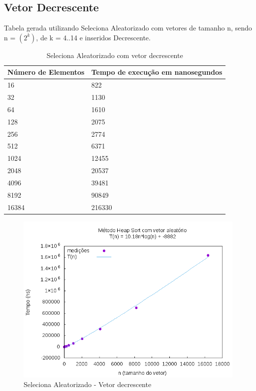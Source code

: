 \documentclass[12pt,a4paper,twoside]{report}
\begin{document}
\subsection{Vetor Decrescente}
Tabela gerada utilizando Seleciona Aleatorizado com vetores de tamanho n, sendo n = $(2^k)$, de k = 4..14 e inseridos Decrescente.
\begin{table}[H]
\centering
\caption{Seleciona Aleatorizado com vetor decrescente}
\label{my-label}
\begin{tabular}{|l|l|}
\hline
\multicolumn{1}{|c|}{\textbf{Número de Elementos}} & \multicolumn{1}{c|}{\textbf{Tempo de execução em nanosegundos}} \\ \hline
16 & 822 \\ \hline
32 & 1130 \\ \hline
64 & 1610 \\ \hline
128 & 2075 \\ \hline
256 & 2774 \\ \hline
512 & 6371 \\ \hline
1024 & 12455 \\ \hline
2048 & 20537 \\ \hline
4096 & 39481 \\ \hline
8192 & 90849 \\ \hline
16384 & 216330 \\ \hline

\end{tabular}
\end{table}

\begin{figure}[H]
    \centering
    \includegraphics[width=0.7\linewidth]{graficos/HeapSort/vIntAleatorio/vIntAleatorio.png}
  \caption{Seleciona Aleatorizado - Vetor decrescente}
\end{figure}
\end{document}
